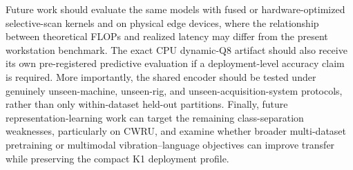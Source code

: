 Future work should evaluate the same models with fused or hardware-optimized selective-scan kernels and on physical edge devices, where the relationship between theoretical FLOPs and realized latency may differ from the present workstation benchmark. The exact CPU dynamic-Q8 artifact should also receive its own pre-registered predictive evaluation if a deployment-level accuracy claim is required. More importantly, the shared encoder should be tested under genuinely unseen-machine, unseen-rig, and unseen-acquisition-system protocols, rather than only within-dataset held-out partitions. Finally, future representation-learning work can target the remaining class-separation weaknesses, particularly on CWRU, and examine whether broader multi-dataset pretraining or multimodal vibration--language objectives can improve transfer while preserving the compact K1 deployment profile.
